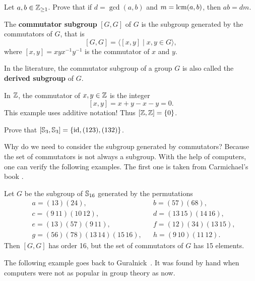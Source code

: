 \begin{exercise}
Let $a,b\in\mathbb{Z}_{\geq1}$. Prove that if $d=\gcd(a,b)$ and $m=\mathrm{lcm}(a,b)$, then 
$ab=dm$.
\end{exercise}


\begin{definition}
        The \textbf{commutator subgroup}
        $[G,G]$ of $G$ 
        is the subgroup generated by 
        the commutators of $G$, that is 
        \[
        [G,G]=\langle[x,y]\mid x,y\in G\rangle,
        \]
        where $[x,y]=xyx^{-1}y^{-1}$ is the commutator of 
        $x$ and $y$.
\end{definition}
  
In the literature, the commutator subgroup of a group $G$ is also called the \textbf{derived 
subgroup} of $G$. 
       
\begin{example}
        In $\mathbb{Z}$, the commutator of $x,y\in \mathbb{Z}$ 
        is the integer
        \[
        [x,y]=x+y-x-y=0.
        \]
        This example uses additive notation! 
        Thus $[\mathbb{Z},\mathbb{Z}]=\{0\}$. 
\end{example}
        
\begin{exercise}
        Prove that $[\mathbb{S}_3,\mathbb{S}_3]=\{\operatorname{id},(123),(132)\}$.
\end{exercise}
        
Why do we need to consider the subgroup 
generated by commutators? Because the set of commutators 
is not always a subgroup. With the help of computers, 
one can verify the following examples. 
The first one is taken from Carmichael's book
\cite{MR0075938}.

\begin{example}
        Let $G$ be the subgroup of $\mathbb{S}_{16}$ 
        generated by the permutations 
        \begin{align*}
&a = (13)(24),&&
b = (57)(68),\\
&c = (9\,11)(10\,12),&&
d = (13\,15)(14\,16),\\
&e = (13)(57)(9\,11),&&
f = (12)(34)(13\,15),\\
&g = (56)(78)(13\,14)(15\,16),&&
h = (9\,10)(11\,12).
\end{align*}
Then $[G,G]$ has order 16, but the set of commutators of 
$G$ has 15 elements. 
\end{example}

The following example goes back to Guralnick~\cite{MR673806}. 
It was found by hand when computers were not as popular
in group theory as now. 

